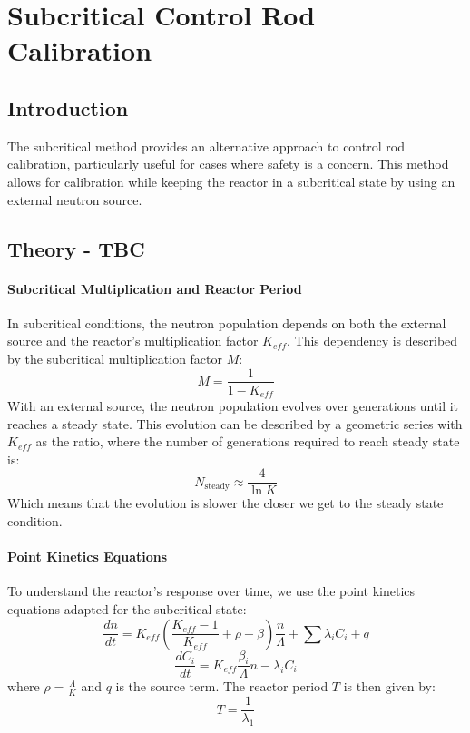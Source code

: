 \section{Subcritical Control Rod Calibration}

\subsection{Introduction}
The subcritical method provides an alternative approach to control rod calibration, particularly useful for cases where safety is a concern. 
This method allows for calibration while keeping the reactor in a subcritical state by using an external neutron source.

\subsection{Theory - TBC}
\paragraph{Subcritical Multiplication and Reactor Period}
In subcritical conditions, the neutron population depends on both the external source and the reactor’s multiplication factor $K_{eff}$. This dependency is described by the subcritical multiplication factor $M$:
\begin{equation}
    M = \frac{1}{1 - K_{eff}}
\end{equation}
With an external source, the neutron population evolves over generations until it reaches a steady state. 
This evolution can be described by a geometric series with $K_{eff}$ as the ratio, where the number of generations required to reach steady state is:
\begin{equation}
    N_{\text{steady}} \approx \frac{4}{\ln K}
\end{equation}
Which means that the evolution is slower the closer we get to the steady state condition.

\paragraph{Point Kinetics Equations}
To understand the reactor's response over time, we use the point kinetics equations adapted for the subcritical state:
\begin{equation}
    \frac{dn}{dt} = K_{eff} \left( \frac{K_{eff} - 1}{K_{eff}} + \rho - \beta \right) \frac{n}{\Lambda} + \sum \lambda_i C_i + q
\end{equation}
\begin{equation}
    \frac{dC_i}{dt} = K_{eff} \frac{\beta_i}{\Lambda} n - \lambda_i C_i
\end{equation}
where $\rho = \frac{\Lambda}{K}$ and $q$ is the source term. The reactor period $T$ is then given by:
\begin{equation}
    T = \frac{1}{\lambda_1}
\end{equation}

